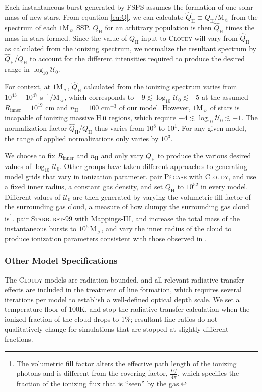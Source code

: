 \documentclass[twocolumn, tighten]{aastex61}
\newcommand{\Eq}[1]{\autoref{eq:#1}}
\newcommand{\FSPS}{{\sc FSPS}\xspace}
\newcommand{\Mappings}{{\sc Mappings-III}\xspace}
\newcommand{\Pegase}{\textsc{P{\'e}gase}\xspace}
\newcommand{\SB}{\textsc{Starburst-99}\xspace}
\newcommand{\Cloudy}{\textsc{Cloudy}\xspace}
\newcommand{\logten}{\ensuremath{\log_{10}}}
\newcommand\Msun{\ensuremath{\mathrm{M_{\sun}}}}
\newcommand{\hii}{H\,{\sc ii}\xspace}
\newcommand{\nH}{\ensuremath{n_{\mathrm{H}}}}
\newcommand{\cm}[1]{\ensuremath{\mathrm{cm}^{#1}}}
\newcommand{\Rin}{\ensuremath{R_{\mathrm{inner}}}}
\newcommand{\QH}{\ensuremath{Q_{\mathrm{H}}}}
\newcommand{\QHat}{\ensuremath{\hat{Q}_{\mathrm{H}}}}
\newcommand{\U}{\ensuremath{\mathcal{U}_{0}}}
\newcommand{\logU}{\ensuremath{\logten \mathcal{U}_0}}
\begin{document}
Each instantaneous burst generated by \FSPS assumes the formation of one solar mass of new stars. From equation \Eq{Q}, we can calculate $\QHat \equiv \QH/\Msun$ from the spectrum of each $1\Msun$ SSP. \QH{} for an arbitrary population is then \QHat{} times the mass in stars formed. Since the value of \QH{} input to \Cloudy will vary from \QHat{} as calculated from the ionizing spectrum, we normalize the resultant spectrum by \QHat{}/\QH{} to account for the different intensities required to produce the desired range in \logU{}.

For context, at $1 \Msun{}$, \QHat{} calculated from the ionizing spectrum varies from $10^{43} - 10^{47}$ s$^{-1}/\Msun{}$, which corresponds to $-9 \lesssim \logU \lesssim -5$ at the assumed $\Rin{} = 10^{19}$ cm and $\nH=100$ \cm{-3} of our model. However, $1\Msun$ of stars is incapable of ionizing massive \hii regions, which require $-4 \lesssim \logU \lesssim -1$. The normalization factor \QHat{}/\QH{} thus varies from $10^8$ to $10^1$. For any given model, the range of applied normalizations only varies by $10^3$.

We choose to fix \Rin{} and \nH{} and only vary \QH{} to produce the various desired values of \logU{}. Other groups have taken different approaches to generating model grids that vary in ionization parameter. \citet{Moy01} pair \Pegase with \Cloudy, and use a fixed inner radius, a constant gas density, and set \QH{} to $10^{52}$ in every model. Different values of \U{} are then generated by varying the volumetric fill factor of the surrounding gas cloud, a measure of how clumpy the surrounding gas cloud is\footnote{The volumetric fill factor alters the effective path length of the ionizing photons and is different from the covering factor, $\frac{\Omega/}{4\pi}$, which specifies the fraction of the ionizing flux that is ``seen'' by the gas.}. \citet{Levesque10} pair \SB with \Mappings, and increase the total mass of the instantaneous bursts to $10^6\,\Msun$, and vary the inner radius of the cloud to produce ionization parameters consistent with those observed in \citet{Rigby04}.

\subsubsection{Other Model Specifications}\label{sec:methods:cloudy:other}

The \Cloudy models are radiation-bounded, and all relevant radiative transfer effects are included in the treatment of line formation, which requires several iterations per model to establish a well-defined optical depth scale. We set a temperature floor of $100$K, and stop the radiative transfer calculation when the ionized fraction of the cloud drops to 1\%; resultant line ratios do not qualitatively change for simulations that are stopped at slightly different fractions.
\end{document}

